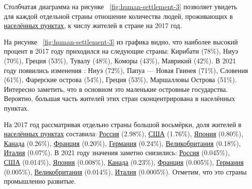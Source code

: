 Столбчатая диаграмма на рисунке ~\ref{fig:human-settlement-3} позволяет увидеть для каждой отдельной страны отношение количества людей, проживающих в \href{http://www.wikidata.org/entity/Q486972}{населённых пунктах}, к числу жителей в стране на 2017 год.

\begin{figure*}
    \setlength{\fboxsep}{0pt}%
    \setlength{\fboxrule}{1pt}%
	\label{fig:human-settlement-3}
	\caption[Диаграмма доли населения страны. Карелия, 2017.]{Диаграмма доли населения страны, проживающего в "населённых пунктах" (2017). Ссылка на SPARQL-запрос: \href{https://w.wiki/4T4s}{https://w.wiki/4T4s}.}%
\end{figure*} 

\begin{figure*}
    \setlength{\fboxsep}{0pt}%
    \setlength{\fboxrule}{1pt}%
	\label{fig:human-settlement-4}
	\caption[Диаграмма доли населения страны, 2021.]{Диаграмма доли населения страны, проживающего в <<населённых пунктах>> (2021). Ссылка на SPARQL-запрос: \href{https://w.wiki/4T4s}{https://w.wiki/4T4s}}%
\end{figure*} 

На рисунке ~\ref{fig:human-settlement-3} из графика видно, что наиболее высокий процент в 2017 году приходился на следующие страны: Кирибати (78\%), Ниуэ (70\%), Греция (53\%), Тувалу (48\%), Коморы (43\%), Маврикий (42\%). В 2021 году появились изменения : Ниуэ (72\%), Папуа — Новая Гвинея (71\%), Словения (61\%), Фарерские острова (54\%), Греция (53\%), Маршалловы Острова (51\%). Интересно заметить, что в основном это маленькие островные государства. Вероятно, большая часть жителей этих стран сконцентрирована в населённых пунктах.

На 2017 год рассматривая отдельно страны большой восьмёрки, доля жителей в \href{http://www.wikidata.org/entity/Q486972}{населённых пунктах} составила: \href{http://www.wikidata.org/entity/Q159}{Россия} (\num{2.98}\%), \href{http://www.wikidata.org/entity/Q30}{США} (\num{1.76}\%), \href{http://www.wikidata.org/entity/Q17}{Япония} (\num{0.80}\%), \href{http://www.wikidata.org/entity/Q16}{Канада} (\num{0.26}\%), \href{http://www.wikidata.org/entity/Q142}{Франция} (\num{0.20}\%), \href{http://www.wikidata.org/entity/Q183}{Германия} (\num{0.24}\%), \href{http://www.wikidata.org/entity/Q145}{Великобритания} (\num{0.18}\%), \href{http://www.wikidata.org/entity/Q38}{Италия} (\num{0.07}\%). В 2021 году значения заметно снизились: \href{http://www.wikidata.org/entity/Q159}{Россия} (0.045\%), \href{http://www.wikidata.org/entity/Q30}{США} (\num{0.014}\%), \href{http://www.wikidata.org/entity/Q17}{Япония} (\num{0.008}\%), \href{http://www.wikidata.org/entity/Q16}{Канада} (\num{0.23}\%), \href{http://www.wikidata.org/entity/Q142}{Франция} (\num{0.005}\%), \href{http://www.wikidata.org/entity/Q183}{Германия} (\num{0.005}\%), \href{http://www.wikidata.org/entity/Q145}{Великобритания} (\num{0.014}\%), \href{http://www.wikidata.org/entity/Q38}{Италия} (\num{0.0005}\%). Отметим, что это страны промышленно развитые.

